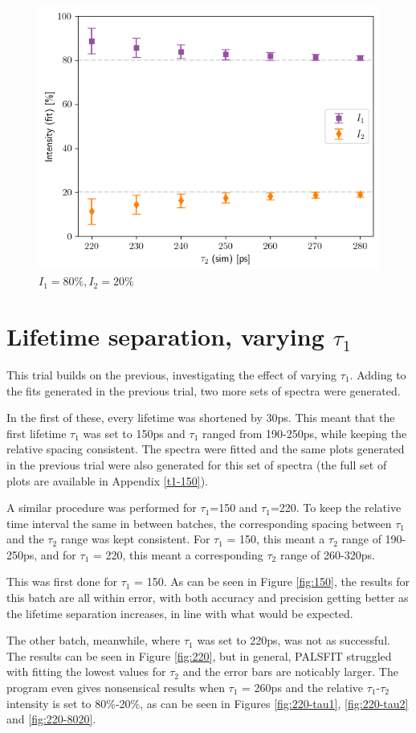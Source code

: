 \begin{figure}[h]
    \centering
    \includegraphics[width=0.5\linewidth]{Batch 1+2/Batch1+2/output/plotfin/8020.png}
    \caption{$I_1 = 80\%, I_2 = 20\%$}
    \label{fig:180-8020}
\end{figure}

\pagebreak

\section{Lifetime separation, varying $\tau_1$}

This trial builds on the previous, investigating the effect of varying $\tau_1$. Adding to the fits generated in the previous trial, two more sets of spectra were generated. 

In the first of these, every lifetime was shortened by 30ps. This meant that the first lifetime $\tau_1$ was set to 150ps and $\tau_1$ ranged from 190-250ps, while keeping the relative spacing consistent. The spectra were fitted and the same plots generated in the previous trial were also generated for this set of spectra (the full set of plots are available in Appendix \ref{t1-150}). 

A similar procedure was performed for $\tau_1$=150 and $\tau_1$=220. To keep the relative time interval the same in between batches, the corresponding spacing between $\tau_1$ and the $\tau_2$ range was kept consistent. For $\tau_1$ = 150, this meant a $\tau_2$ range of 190-250ps, and for $\tau_1$ = 220, this meant a corresponding $\tau_2$ range of 260-320ps.

This was first done for $\tau_1$ = 150. As can be seen in Figure \ref{fig:150}, the results for this batch are all within error, with both accuracy and precision getting better as the lifetime separation increases, in line with what would be expected.

The other batch, meanwhile, where $\tau_1$ was set to 220ps, was not as successful. The results can be seen in Figure \ref{fig:220}, but in general, PALSFIT struggled with fitting the lowest values for $\tau_2$ and the error bars are noticably larger. The program even gives nonsensical results when $\tau_1$ = 260ps and the relative $\tau_1$-$\tau_2$ intensity is set to 80\%-20\%, as can be seen in Figures \ref{fig:220-tau1}, \ref{fig:220-tau2} and \ref{fig:220-8020}.

